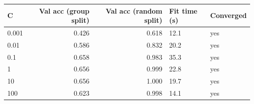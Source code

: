 \begin{tabular}{lrrll}
\toprule
C & Val acc (group split) & Val acc (random split) & Fit time (s) & Converged \\
\midrule
0.001 & 0.426 & 0.618 & 12.1 & yes \\
0.01 & 0.586 & 0.832 & 20.2 & yes \\
0.1 & 0.658 & 0.983 & 35.3 & yes \\
1 & 0.656 & 0.999 & 22.8 & yes \\
10 & 0.656 & 1.000 & 19.7 & yes \\
100 & 0.623 & 0.998 & 14.1 & yes \\
\bottomrule
\end{tabular}

